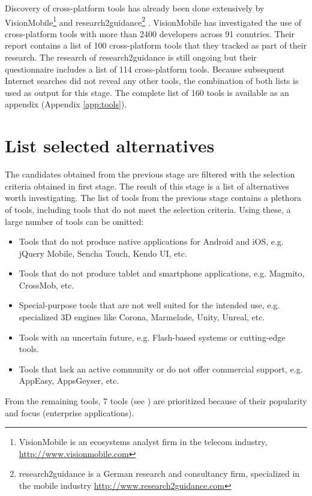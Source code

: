 Discovery of cross-platform tools has already been done extensively by VisionMobile\footnote{VisionMobile is an ecosystems analyst firm in the telecom industry, \url{http://www.visionmobile.com}} \cite{VMCPT:2012} and \mbox{research2guidance}\footnote{research2guidance is a German research and consultancy firm, specialized in the mobile industry \url{http://www.research2guidance.com}} \cite{Research2guidance}. VisionMobile has investigated the use of cross-platform tools with more than 2400 developers across 91 countries. Their report contains a list of 100 cross-platform tools that they tracked as part of their research. The research of \mbox{research2guidance} is still ongoing but their questionnaire includes a list of 114 cross-platform tools. Because subsequent Internet searches did not reveal any other tools, the combination of both lists is used as output for this stage. The complete list of 160 tools is available as an appendix (Appendix \ref{app:tools}).

\section{List selected alternatives}

The candidates obtained from the previous stage are filtered with the selection criteria obtained in first stage. The result of this stage is a list of alternatives worth investigating. The list of tools from the previous stage contains a plethora of tools, including tools that do not meet the selection criteria. Using these, a large number of tools can be omitted:

\begin{itemize}
    \item Tools that do not produce native applications for Android and iOS, e.g. jQuery Mobile, Sencha Touch, Kendo UI, etc.
    \item Tools that do not produce tablet and smartphone applications, e.g. Magmito, CrossMob, etc.
    \item Special-purpose tools that are not well suited for the intended use, e.g. specialized 3D engines like Corona, Marmelade, Unity, Unreal, etc.
    \item Tools with an uncertain future, e.g. Flash-based systems or cutting-edge tools.
    \item Tools that lack an active community or do not offer commercial support, e.g. AppEasy, AppsGeyser, etc. 
\end{itemize}

From the remaining tools, 7 tools (see ) are prioritized because of their popularity and focus (enterprise applications).

